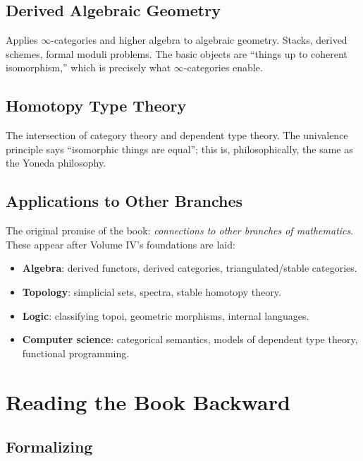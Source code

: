 \subsection{Derived Algebraic Geometry}

Applies $\infty$-categories and higher algebra to algebraic geometry.
Stacks, derived schemes, formal moduli problems. The basic objects are
``things up to coherent isomorphism,'' which is precisely what
$\infty$-categories enable.

\subsection{Homotopy Type Theory}

The intersection of category theory and dependent type theory. The univalence
principle says ``isomorphic things are equal''; this is, philosophically,
the same as the Yoneda philosophy.

\subsection{Applications to Other Branches}

The original promise of the book: \emph{connections to other branches of
mathematics}. These appear after Volume IV's foundations are laid:
\begin{itemize}
  \item \textbf{Algebra}: derived functors, derived categories,
        triangulated/stable categories.
  \item \textbf{Topology}: simplicial sets, spectra, stable homotopy theory.
  \item \textbf{Logic}: classifying topoi, geometric morphisms, internal
        languages.
  \item \textbf{Computer science}: categorical semantics, models of
        dependent type theory, functional programming.
\end{itemize}


\section{Reading the Book Backward}
\label{sec:reading-backward}

\subsection{Formalizing}

